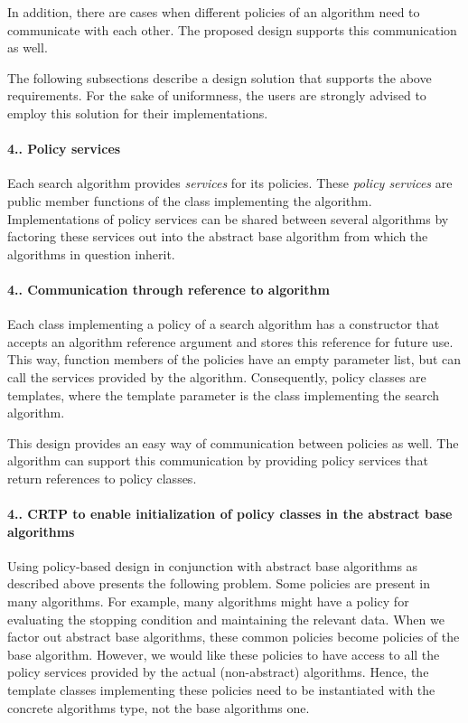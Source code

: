 In addition, there are cases when different policies of an algorithm need to communicate with each other. The proposed design supports this communication as well.

The following subsections describe a design solution that supports the above requirements. For the sake of uniformness, the users are strongly advised to employ this solution for their implementations.\hypertarget{index_s-services}{}\paragraph{4.. Policy services}\label{index_s-services}
Each search algorithm provides {\itshape services} for its policies. These {\itshape policy services} are public member functions of the class implementing the algorithm. Implementations of policy services can be shared between several algorithms by factoring these services out into the abstract base algorithm from which the algorithms in question inherit.\hypertarget{index_s-communication}{}\paragraph{4.. Communication through reference to algorithm}\label{index_s-communication}
Each class implementing a policy of a search algorithm has a constructor that accepts an algorithm reference argument and stores this reference for future use. This way, function members of the policies have an empty parameter list, but can call the services provided by the algorithm. Consequently, policy classes are templates, where the template parameter is the class implementing the search algorithm.

This design provides an easy way of communication between policies as well. The algorithm can support this communication by providing policy services that return references to policy classes.\hypertarget{index_s-base-crtp}{}\paragraph{4.. C\+R\+T\+P to enable initialization of policy classes in the abstract base algorithms}\label{index_s-base-crtp}
Using policy-\/based design in conjunction with abstract base algorithms as described above presents the following problem. Some policies are present in many algorithms. For example, many algorithms might have a policy for evaluating the stopping condition and maintaining the relevant data. When we factor out abstract base algorithms, these common policies become policies of the base algorithm. However, we would like these policies to have access to all the policy services provided by the actual (non-\/abstract) algorithms. Hence, the template classes implementing these policies need to be instantiated with the concrete algorithm\textquotesingle{}s type, not the base algorithm\textquotesingle{}s one.

